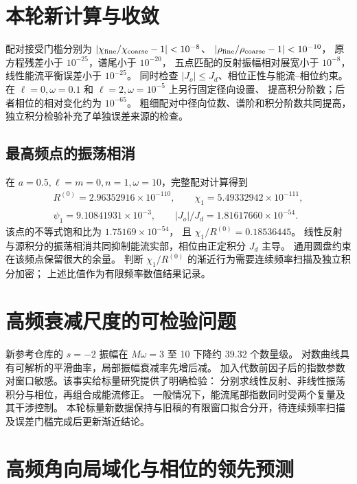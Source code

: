 \documentclass[UTF8,fontset=fandol,11pt,a4paper]{ctexart}
\numberwithin{equation}{section}
\begin{document}
\section{本轮新计算与收敛}
配对接受门槛分别为 $|\chi_{\rm fine}/\chi_{\rm coarse}-1|<10^{-8}$、
$|\rho_{\rm fine}/\rho_{\rm coarse}-1|<10^{-10}$，
原方程残差小于 $10^{-25}$，谱尾小于 $10^{-20}$，
五点匹配的反射振幅相对展宽小于 $10^{-8}$，线性能流平衡误差小于 $10^{-25}$。
同时检查 $|J_o|\leq J_d$、相位正性与能流--相位约束。
在 $\ell=0,\omega=0.1$ 和 $\ell=2,\omega=10^{-5}$ 上另行固定径向设置、
提高积分阶数；后者相位的相对变化约为 $10^{-65}$。
粗细配对中径向位数、谱阶和积分阶数共同提高，独立积分检验补充了单独误差来源的检查。

\subsection{最高频点的振荡相消}
在 $a=0.5,\ell=m=0,n=1,\omega=10$，完整配对计算得到
\begin{gather}
R^{(0)}=2.96352916\times10^{-110},\qquad
\chi_1=5.49332942\times10^{-111},\\
\psi_1=9.10841931\times10^{-3},\qquad
|J_o|/J_d=1.81617660\times10^{-54}.
\end{gather}
该点的不等式饱和比为 $1.75169\times10^{-54}$，
且 $\chi_1/R^{(0)}=0.18536445$。
线性反射与源积分的振荡相消共同抑制能流实部，相位由正定积分 $J_d$ 主导。
通用圆盘约束在该频点保留很大的余量。
判断 $\chi_1/R^{(0)}$ 的渐近行为需要连续频率扫描及独立积分加密；
上述比值作为有限频率数值结果记录。

\section{高频衰减尺度的可检验问题}
新参考仓库的 $s=-2$ 振幅在 $M\omega=3$ 至 10 下降约 39.32 个数量级。
对数曲线具有可解析的平滑曲率，局部振幅衰减率先增后减。
加入代数前因子后的指数参数对窗口敏感。该事实给标量研究提供了明确检验：
分别求线性反射、非线性振荡积分与相位，再组合成能流修正。
一般情况下，能流尾部指数同时受两个复量及其干涉控制。
本轮标量新数据保持与旧稿的有限窗口拟合分开，待连续频率扫描及误差门槛完成后更新渐近结论。

\section{高频角向局域化与相位的领先预测}
\end{document}
